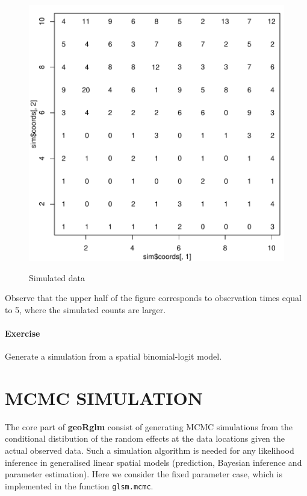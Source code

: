 \documentclass[12pt,a4paper]{article}
\newcommand{\strong}[1]{{\textbf{ #1}}}
\let\pkg=\strong
\newcommand{\code}[1]{\texttt{\small #1}}
\begin{document}
\begin{figure}[!h]
\centering
\begin{Schunk}
\end{Schunk}
\includegraphics{geoRglmintro-009}
\label{fig:simulation}
\caption{Simulated data}
\end{figure}
Observe that the upper half of the figure corresponds to observation
times equal to 5, where the simulated counts are larger.


\paragraph*{Exercise}

Generate a simulation from a spatial binomial-logit model.


\section{MCMC SIMULATION}

The core part of \pkg{geoRglm} consist of generating MCMC simulations from
the conditional distibution of the random effects
at the data locations given the actual observed data. Such a simulation
algorithm 
is needed for any likelihood inference in generalised linear spatial
models (prediction, Bayesian inference and parameter estimation). Here
we consider the fixed parameter case, which is implemented in the
function \code{glsm.mcmc}.
\end{document}
